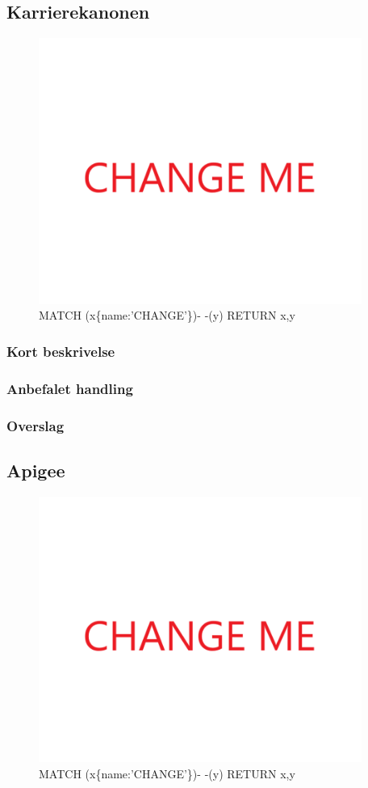 \documentclass{article}
\begin{document}
\subsection{Karrierekanonen}
\begin{figure}[h]
\includegraphics[width=300pt]{CHANGE.PNG}
\caption{MATCH (x\{name:'CHANGE'\})- -(y) RETURN x,y}
\end{figure}
\subsubsection{Kort beskrivelse}
\subsubsection{Anbefalet handling}
\subsubsection{Overslag}
\subsection{Apigee}
\begin{figure}[h]
\includegraphics[width=300pt]{CHANGE.PNG}
\caption{MATCH (x\{name:'CHANGE'\})- -(y) RETURN x,y}
\end{figure}
\end{document}
